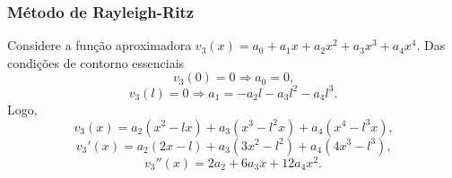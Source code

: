 \documentclass{beamer}
\begin{document}
%		
%	
%		
%	
%		
	
	\begin{frame}
		\frametitle{Método de Rayleigh-Ritz}
		\justify
		
		Considere a função aproximadora $v_3(x)=a_0 + a_1 x + a_2 x^2 + a_3 x^3 + a_4 x^4$. \pause Das condições de contorno essenciais
		$$
			v_3(0)=0\Longrightarrow a_0 = 0\text{,}
		$$
		\pause
		$$
			v_3(l)=0\Longrightarrow a_1 = -a_2l - a_3l^2 - a_4l^3\text{.}
		$$
		\pause
		Logo, 
		$$v_3(x)=a_2(x^2-lx)+a_3(x^3-l^2x) + a_4(x^4-l^3x)\text{,}$$
		\pause 
		$$v_3'(x)=a_2(2x-l)+a_3(3x^2-l^2)+a_4(4x^3-l^3)\text{,}$$
		\pause
		$$v_3''(x)=2a_2 + 6a_3x + 12a_4x^2\text{.}$$
	\end{frame}
	
\end{document}

